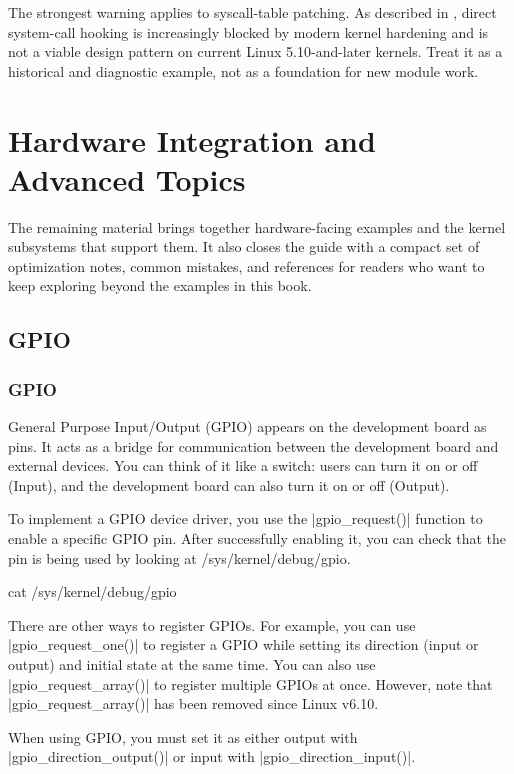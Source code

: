 \documentclass[10pt, oneside]{book}
\begin{document}
The strongest warning applies to syscall-table patching.
As described in , direct system-call hooking is increasingly
blocked by modern kernel hardening and is not a viable design pattern on current
Linux 5.10-and-later kernels.
Treat it as a historical and diagnostic example, not as a foundation for new
module work.

\chapter{Hardware Integration and Advanced Topics}
The remaining material brings together hardware-facing examples and the kernel
subsystems that support them. It also closes the guide with a compact set of
optimization notes, common mistakes, and references for readers who want to
keep exploring beyond the examples in this book.

\section{GPIO}
\label{sec:gpio}
\subsection{GPIO}
\label{sec:gpio_introduction}
General Purpose Input/Output (GPIO) appears on the development board as pins.
It acts as a bridge for communication between the development board and external devices.
You can think of it like a switch: users can turn it on or off (Input), and the development board can also turn it on or off (Output).

To implement a GPIO device driver, you use the \cpp|gpio_request()| function to enable a specific GPIO pin.
After successfully enabling it, you can check that the pin is being used by looking at /sys/kernel/debug/gpio.

\begin{codebash}
cat /sys/kernel/debug/gpio
\end{codebash}

There are other ways to register GPIOs.
For example, you can use \cpp|gpio_request_one()| to register a GPIO while setting its direction (input or output) and initial state at the same time.
You can also use \cpp|gpio_request_array()| to register multiple GPIOs at once. However, note that \cpp|gpio_request_array()| has been removed since Linux v6.10.

When using GPIO, you must set it as either output with \cpp|gpio_direction_output()| or input with \cpp|gpio_direction_input()|.
\end{document}
